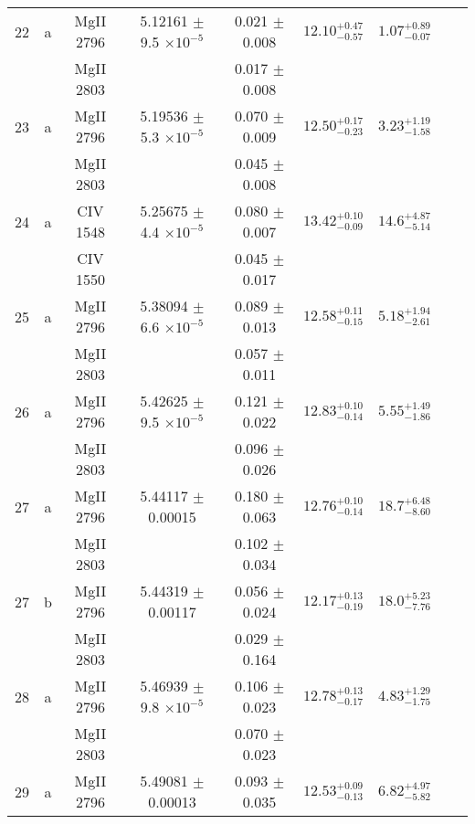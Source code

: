 \documentclass[12pt]{article}
\begin{document}
\begin{footnotesize}
\begin{longtable}{ c c c c c c c c c}
      22  & a  & MgII     2796  &  5.12161 $\pm$ 9.5 $\times 10^{-5}$   &  0.021 $\pm$ 0.008   & $12.10_{ - 0.57}^{ + 0.47}$  & $1.07_{ - 0.07}^{ + 0.89}$    & 	 & \\ 
  &   & MgII     2803  &  &  0.017 $\pm$ 0.008   &   &     & 	 & \\ 
      23  & a  & MgII     2796  &  5.19536 $\pm$ 5.3 $\times 10^{-5}$   &  0.070 $\pm$ 0.009   & $12.50_{ - 0.23}^{ + 0.17}$  & $3.23_{ - 1.58}^{ + 1.19}$    & 	 & \\ 
  &   & MgII     2803  &  &  0.045 $\pm$ 0.008   &   &     & 	 & \\ 
      24  & a  & CIV     1548  &  5.25675 $\pm$ 4.4 $\times 10^{-5}$   &  0.080 $\pm$ 0.007   & $13.42_{ - 0.09}^{ + 0.10}$  & $14.6_{ - 5.14}^{ + 4.87}$    & 	 & \\ 
  &   & CIV     1550  &  &  0.045 $\pm$ 0.017   &   &     & 	 & \\ 
      25  & a  & MgII     2796  &  5.38094 $\pm$ 6.6 $\times 10^{-5}$   &  0.089 $\pm$ 0.013   & $12.58_{ - 0.15}^{ + 0.11}$  & $5.18_{ - 2.61}^{ + 1.94}$    & 	 & \\ 
  &   & MgII     2803  &  &  0.057 $\pm$ 0.011   &   &     & 	 & \\ 
      26  & a  & MgII     2796  &  5.42625 $\pm$ 9.5 $\times 10^{-5}$   &  0.121 $\pm$ 0.022   & $12.83_{ - 0.14}^{ + 0.10}$  & $5.55_{ - 1.86}^{ + 1.49}$    & 	 & \\ 
  &   & MgII     2803  &  &  0.096 $\pm$ 0.026   &   &     & 	 & \\ 
      27  & a  & MgII     2796  &  5.44117 $\pm$ 0.00015  &  0.180 $\pm$ 0.063   & $12.76_{ - 0.14}^{ + 0.10}$  & $18.7_{ - 8.60}^{ + 6.48}$    & 	 & \\ 
  &   & MgII     2803  &  &  0.102 $\pm$ 0.034   &   &     & 	 & \\ 
      27  & b  & MgII     2796  &  5.44319 $\pm$ 0.00117  &  0.056 $\pm$ 0.024   & $12.17_{ - 0.19}^{ + 0.13}$  & $18.0_{ - 7.76}^{ + 5.23}$    & 	 & \\ 
  &   & MgII     2803  &  &  0.029 $\pm$ 0.164   &   &     & 	 & \\ 
      28  & a  & MgII     2796  &  5.46939 $\pm$ 9.8 $\times 10^{-5}$   &  0.106 $\pm$ 0.023   & $12.78_{ - 0.17}^{ + 0.13}$  & $4.83_{ - 1.75}^{ + 1.29}$    & 	 & \\ 
  &   & MgII     2803  &  &  0.070 $\pm$ 0.023   &   &     & 	 & \\ 
      29  & a  & MgII     2796  &  5.49081 $\pm$ 0.00013  &  0.093 $\pm$ 0.035   & $12.53_{ - 0.13}^{ + 0.09}$  & $6.82_{ - 5.82}^{ + 4.97}$    & 	 & \\ 

\end{longtable}
\end{footnotesize}
\end{document}
